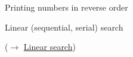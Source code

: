 \documentclass[usenames,dvipsnames,aspectratio=169]{beamer}
\begin{document}
\begin{frame}{Printing numbers in reverse order}
    \begin{exampleblock}{}
    \scriptsize
    
  \end{exampleblock}
\end{frame}

\begin{frame}{Linear (sequential, serial) search}
    \begin{exampleblock}{ ($\to$ \href{https://en.wikipedia.org/wiki/Linear\_search}{Linear search})}
    \scriptsize
    
  \end{exampleblock}
\end{frame}
\end{document}
